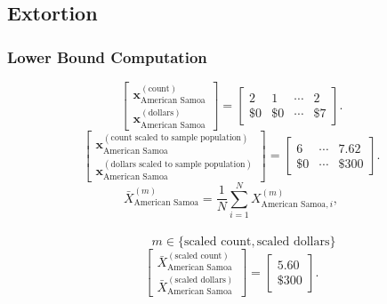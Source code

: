 \subsection{Extortion}\label{sec:extortion}
\subsubsection{Lower Bound Computation}
\[
\begin{bmatrix}
\mathbf{x}_{\text{American Samoa}}^{(\text{count})}\\
\mathbf{x}_{\text{American Samoa}}^{(\text{dollars})}
\end{bmatrix}
=
\begin{bmatrix}
2 & 1 & \cdots & 2\\
\$0 & \$0 & \cdots & \$7
\end{bmatrix}.
\]
\[
\begin{bmatrix}
\mathbf{x}_{\text{American Samoa}}^{(\text{count scaled to sample population})}\\
\mathbf{x}_{\text{American Samoa}}^{(\text{dollars scaled to sample population})}
\end{bmatrix}
=
\begin{bmatrix}
6 & \cdots & 7.62\\
\$0 & \cdots & \$300
\end{bmatrix}.
\]
  \[
\bar{X}_{\text{American Samoa}}^{(m)}
= \frac{1}{N}\sum_{i=1}^{N} X_{\text{American Samoa},i}^{(m)},
\]
\\
\[
\qquad
m \in \{\text{scaled count},\text{scaled dollars}\}
\]
\[
\begin{bmatrix}
\bar{X}_{\text{American Samoa}}^{(\text{scaled count})}\\
\bar{X}_{\text{American Samoa}}^{(\text{scaled dollars})}
\end{bmatrix}
=
\begin{bmatrix}
5.60\\
\$300
\end{bmatrix}.
\]
